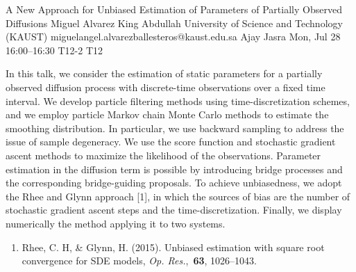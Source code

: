 \begin{talk}
  {A New Approach for Unbiased Estimation of Parameters of Partially Observed Diffusions}%
  {Miguel Alvarez}%
  {King Abdullah University of Science and Technology (KAUST)}%
  {miguelangel.alvarezballesteros@kaust.edu.sa}%
  {Ajay Jasra}%
  {}%
  {Mon, Jul 28 16:00--16:30}%
  {T12-2}%
  {T12}%
  
    
   
In this talk, we consider the estimation of static parameters for a partially observed diffusion process with discrete-time observations over a fixed time interval. We develop particle filtering methods using time-discretization schemes, and we employ particle Markov chain Monte Carlo methods to estimate the smoothing distribution. In particular, we use backward sampling to address the issue of sample degeneracy. We use the score function and stochastic gradient ascent methods to maximize the likelihood of the observations. Parameter estimation in the diffusion term is possible by introducing bridge processes and the corresponding bridge-guiding proposals. To achieve unbiasedness, we adopt the Rhee and Glynn approach [1], in which the sources of bias are the number of stochastic gradient ascent steps and the time-discretization. Finally, we display numerically the method applying it to two systems. 

\medskip

\begin{enumerate}
 \item[{[1]}] Rhee, C. H, \& Glynn, H. (2015).  Unbiased estimation with square root convergence for SDE models, \emph{Op. Res.},~{\bf 63}, 1026--1043. 
\end{enumerate}

\end{talk}


